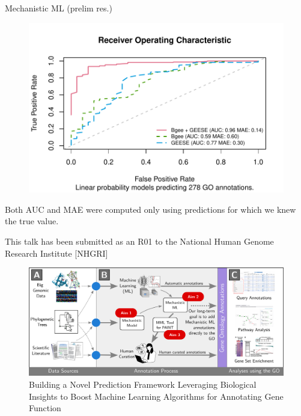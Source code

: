 \documentclass[10pt,aspectratio=169]{beamer}
\newcounter{frame}[frame]
\begin{document}
\begin{frame}{Mechanistic ML (prelim res.)}
    \begin{figure}
        \centering
        \includegraphics[width = .7\linewidth]{fig/logit-aucs-ols-geese.pdf}
        \label{fig:auc-geese-plus-bgee}
    \end{figure}
\vfill
\small Both AUC and MAE were computed only using predictions for which we knew the true value.\normalsize
\end{frame}



\begin{frame}{}

    \footnotesize This talk has been submitted as an R01 to the National Human Genome Research Institute [NHGRI]\normalsize
    
    \begin{figure}
        \includegraphics[width=.95\linewidth]{fig/whole-game.pdf}
        \caption{Building a Novel Prediction Framework Leveraging Biological Insights to Boost Machine Learning Algorithms for Annotating Gene Function}
    \end{figure}
    
\end{frame}
\end{document}
